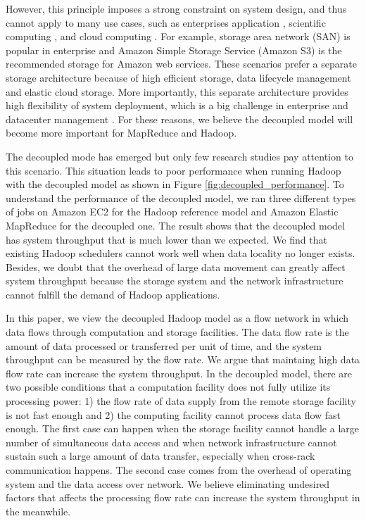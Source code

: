 However, this principle imposes a strong constraint on system design, and thus cannot apply to many use cases, such as enterprises application \cite{MihailescuM2012_MixApart, PorterG2010_SuperDataNodes}, scientific computing \cite{BresnahanJ2011_Cumulus, RamakrishnanL2010_EScience}, and cloud computing \cite{AWS, WindowsAzure, GoogleCloud}.
For example, storage area network (SAN) is popular in enterprise and Amazon Simple Storage Service (Amazon S3) is the recommended storage for Amazon web services.
These scenarios prefer a separate storage architecture because of high efficient storage, data lifecycle management and elastic cloud storage.
More importantly, this separate architecture provides high flexibility of system deployment, which is a big challenge in enterprise and datacenter management \cite{ShaferJ2010_PhD, PorterG2010_SuperDataNodes}.
For these reasons, we believe the decoupled model will become more important for MapReduce and Hadoop.

The decoupled mode has emerged but only few research studies pay attention to this scenario.
This situation leads to poor performance when running Hadoop with the decoupled model as shown in Figure \ref{fig:decoupled_performance}.
To understand the performance of the decoupled model, we ran three different types of jobs on Amazon EC2 for the Hadoop reference model and Amazon Elastic MapReduce for the decoupled one.
The result shows that the decoupled model has system throughput that is much lower than we expected.
We find that existing Hadoop schedulers cannot work well when data locality no longer exists.
Besides, we doubt that the overhead of large data movement can greatly affect system throughput because the storage system and the network infrastructure cannot fulfill the demand of Hadoop applications.

In this paper, we view the decoupled Hadoop model as a flow network in which data flows through computation and storage facilities.
The data flow rate is the amount of data  processed or transferred per unit of time, and the system throughput can be measured by the flow rate.
We argue that maintaing high data flow rate can increase the system throughput.
In the decoupled model, there are two possible conditions that a computation facility does not fully utilize its processing power:
1) the flow rate of data supply from the remote storage facility is not fast enough and
2) the computing facility cannot process data flow fast enough.
The first case can happen when the storage facility cannot handle a large number of simultaneous data access and when network infrastructure cannot sustain such a large amount of data transfer, especially when cross-rack communication happens.
The second case comes from the overhead of operating system and the data access over network.
We believe eliminating undesired factors that affects the processing flow rate can increase the system throughput in the meanwhile.

